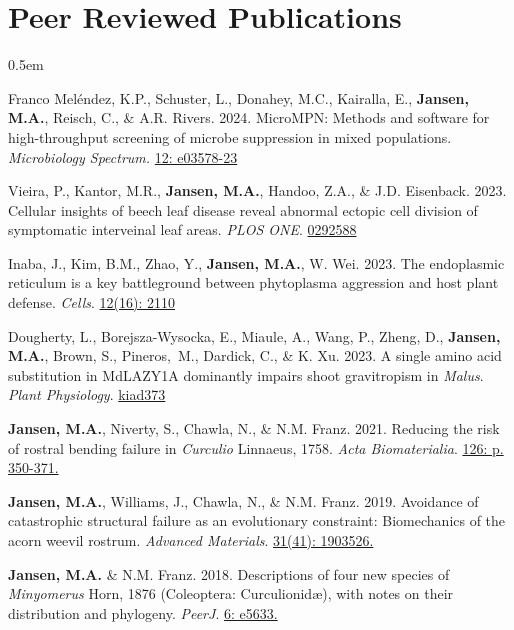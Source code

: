 \documentclass[12pt,a4paper]{article}
\begin{document}
\section*{Peer Reviewed Publications}
	\begin{description}
		\itemsep 0.5em
		
		\item Franco Mel\'{e}ndez, K.P., Schuster, L., Donahey, M.C., Kairalla, E., \textbf{Jansen, M.A.}, Reisch, C., \& A.R. Rivers. 2024. MicroMPN: Methods and software for high-throughput screening of microbe suppression in mixed populations. \textit{Microbiology Spectrum.} \href{https://doi.org/10.1128/spectrum.03578-23}{12: e03578-23}
		
		\item Vieira, P., Kantor, M.R., \textbf{Jansen, M.A.}, Handoo, Z.A., \& J.D. Eisenback. 2023. Cellular insights of beech leaf disease reveal abnormal ectopic cell division of symptomatic interveinal leaf areas. \textit{PLOS ONE}. \href{https://doi.org/10.1371/journal.pone.0292588}{0292588}
		
		\item Inaba, J., Kim, B.M., Zhao, Y., \textbf{Jansen, M.A.}, W. Wei. 2023. The endoplasmic reticulum is a key battleground between phytoplasma aggression and host plant defense. \textit{Cells}. \href{https://doi.org/10.3390/cells12162110}{12(16): 2110}
		
		\item Dougherty, L., Borejsza-Wysocka, E., Miaule, A., Wang, P., Zheng, D., \textbf{Jansen, M.A.}, Brown, S., Pineros,~M., Dardick, C., \& K. Xu. 2023. A single amino acid substitution in MdLAZY1A dominantly impairs shoot gravitropism in \textit{Malus}. \textit{Plant Physiology}. \href{https://doi.org/10.1093/plphys/kiad373}{kiad373}
		
		\item \textbf{Jansen, M.A.}, Niverty, S., Chawla, N., \& N.M. Franz. 2021. Reducing the risk of rostral bending failure in \textit{Curculio} Linnaeus, 1758. \textit{Acta Biomaterialia}. \href{https://doi.org/10.1016/j.actbio.2021.03.029}{126: p. 350-371.}
		
		\item \textbf{Jansen, M.A.}, Williams, J., Chawla, N., \& N.M. Franz. 2019. Avoidance of catastrophic structural failure as an evolutionary constraint: Biomechanics of the acorn weevil rostrum. \textit{Advanced Materials}. \href{https://doi.org/10.1002/adma.201903526}{31(41): 1903526.}
		
		\item \textbf{Jansen, M.A.} \& N.M. Franz. 2018. Descriptions of four new species of \textit{Minyomerus} Horn, 1876 (Coleoptera: Curculionid\ae), with notes on their distribution and phylogeny. \textit{PeerJ}. \href{https://peerj.com/articles/5633/}{6: e5633.}
		

\end{description}
\end{document}
